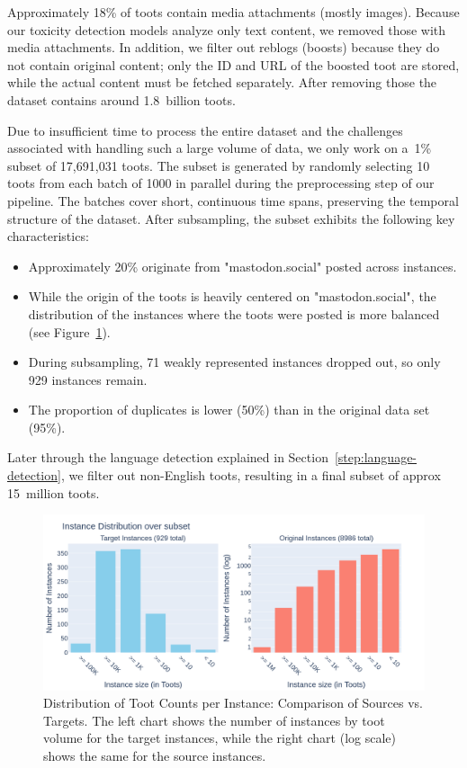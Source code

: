 Approximately 18\% of toots contain media attachments (mostly images). Because our toxicity detection models analyze only text content, we removed those with media attachments. In addition, we filter out reblogs (boosts) because they do not contain original content; only the ID and URL of the boosted toot are stored, while the actual content must be fetched separately. After removing those the dataset contains around 1.8~billion toots.

Due to insufficient time to process the entire dataset and the challenges associated with handling such a large volume of data, we only work on a~1\% subset of 17,691,031 toots.  The subset is generated by randomly selecting 10 toots from each batch of 1000 in parallel during the preprocessing step of our pipeline. The batches cover short, continuous time spans, preserving the temporal structure of the dataset. After subsampling, the subset exhibits the following key characteristics:

\begin{itemize}
\item Approximately 20\% originate from "mastodon.social" posted across instances.
\item While the origin of the toots is heavily centered on "mastodon.social", the distribution of the instances where the toots were posted is more balanced (see Figure~\ref{instance-distribution}).
\item During subsampling, 71 weakly represented instances dropped out, so only 929 instances remain.
\item The proportion of duplicates is lower (50\%) than in the original data set (95\%).
\end{itemize}

Later through the language detection explained in Section~\ref{step:language-detection}, we filter out non-English toots, resulting in a final subset of approx 15~million toots.

\begin{figure}[tb]
    \centering
    \includegraphics[width=\textwidth]{../material/instance_distribution.png}
    \caption{Distribution of Toot Counts per Instance: Comparison of Sources vs. Targets. The left chart shows the number of instances by toot volume for the target instances, while the right chart (log scale) shows the same for the source instances.}
    \label{instance-distribution}
\end{figure}

